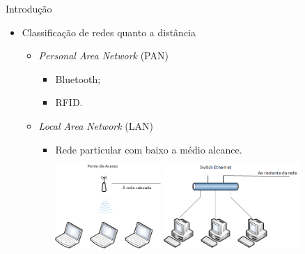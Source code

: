 \documentclass{libs/ufc_format}
\begin{document}
\begin{frame}{Introdução}
    \begin{itemize}
        \item Classificação de redes quanto a distância
            \begin{itemize}
                \item<1-2> \textit{Personal Area Network} (PAN)
                    \begin{itemize}
                        \justifying
                        \item<2> Bluetooth;
                        \item<2> RFID.
                    \end{itemize}
                \item<2-> \textit{Local Area Network} (LAN)
                    \begin{itemize}
                        \justifying
                        \item<3-> Rede particular com baixo a médio alcance.\\
                        \includegraphics[width=0.35\textwidth, height=3.7cm]{media/wifi}
                        \includegraphics[width=0.45\textwidth, height=3.7cm]{media/ethernet}
                    \end{itemize}
            \end{itemize}
    \end{itemize}
\end{frame}
\end{document}
